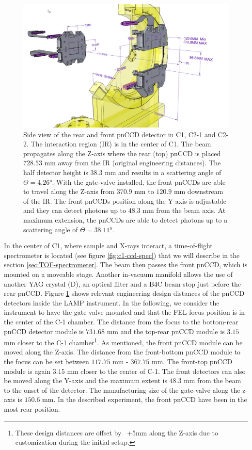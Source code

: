 \begin{figure}
	\centering
		\includegraphics[width=1.0\textwidth]{images/pnCCD-dimensions.jpg}
	\caption[Rear and front pnCCD detector geometry in the LAMP instrument.]{Side view of the rear and front pnCCD detector in C1, C2-1 and C2-2. The interaction region (IR) is in the center of C1. The beam propagates along the Z-axis where the rear (top) pnCCD is placed $728.53$ mm away from the IR (original engineering distances). The half detector height is $38.3$ mm and results in a scattering angle of $\Theta = 4.26$°. With the gate-valve installed, the front pnCCDs are able to travel along the Z-axis from $370.9$ mm to $120.9$ mm downstream of the IR. The front pnCCDs position along the Y-axis is adjustable and they can detect photons up to $48.3$ mm from the beam axis. At maximum extension, the pnCCDs are able to detect photons up to a scattering angle of $\Theta=38.11$°.}
	\label{fig:pnCCD-dimensions}
\end{figure}
In the center of C1, where sample and X-rays interact, a time-of-flight spectrometer is located (see figure \ref{fig:c1-ccd-spec}) that we will describe in the section \ref{sec:TOF-spectrometer}. The beam then passes the front pnCCD, which is mounted on a moveable stage. Another in-vacuum manifold allows the use of another YAG crystal (D), an optical filter and a B4C beam stop just before the rear pnCCD. Figure \ref{fig:pnCCD-dimensions} shows relevant engineering design distances of the pnCCD detectors inside the LAMP instrument. In the following, we consider the instrument to have the gate valve mounted and that the FEL focus position is in the center of the C-1 chamber. The distance from the focus to the bottom-rear pnCCD detector module is $731.68$ mm and the top-rear pnCCD module is $3.15$ mm closer to the C-1 chamber\footnote{These design distances are offset by ~+5mm along the Z-axis due to customization during the initial setup.}. As mentioned, the front pnCCD module can be moved along the Z-axis. The distance from the front-bottom pnCCD module to the focus can be set between $117.75$ mm - $367.75$ mm. The front-top pnCCD module is again $3.15$ mm closer to the center of C-1. The front detectors can also be moved along the Y-axis and the maximum extent is $48.3$ mm from the beam to the onset of the detector. The manufacturing size of the gate-valve along the z-axis is $150.6$ mm. In the described experiment, the front pnCCD have been in the most rear position.\\
%
%
%
